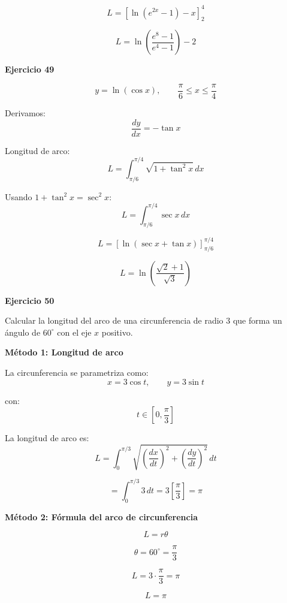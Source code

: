 \documentclass{article}
\begin{document}
\[
L=\left[\ln(e^{2x}-1)-x\right]_{2}^{4}
\]

\[
\boxed{
L=\ln\!\left(\frac{e^8-1}{e^4-1}\right)-2
}
\]

\textbf{Ejercicio 49}

\[
y=\ln(\cos x), \qquad \frac{\pi}{6}\le x\le \frac{\pi}{4}
\]

Derivamos:
\[
\frac{dy}{dx}=-\tan x
\]

Longitud de arco:
\[
L=\int_{\pi/6}^{\pi/4}\sqrt{1+\tan^2 x}\,dx
\]

Usando \(1+\tan^2 x=\sec^2 x\):
\[
L=\int_{\pi/6}^{\pi/4}\sec x\,dx
\]

\[
L=\left[\ln(\sec x+\tan x)\right]_{\pi/6}^{\pi/4}
\]

\[
\boxed{
L=\ln\!\left(\frac{\sqrt{2}+1}{\sqrt{3}}\right)
}
\]


\textbf{Ejercicio 50}

Calcular la longitud del arco de una circunferencia de radio \(3\)
que forma un ángulo de \(60^\circ\) con el eje \(x\) positivo.

\bigskip

\textbf{Método 1: Longitud de arco}

La circunferencia se parametriza como:
\[
x=3\cos t, \qquad y=3\sin t
\]

con:
\[
t\in\left[0,\frac{\pi}{3}\right]
\]

La longitud de arco es:
\[
L=\int_0^{\pi/3}
\sqrt{\left(\frac{dx}{dt}\right)^2+\left(\frac{dy}{dt}\right)^2}\,dt
\]

\[
= \int_0^{\pi/3} 3\,dt
=3\left[\frac{\pi}{3}\right]
=\pi
\]

\bigskip

\textbf{Método 2: Fórmula del arco de circunferencia}

\[
L=r\theta
\]

\[
\theta=60^\circ=\frac{\pi}{3}
\]

\[
L=3\cdot\frac{\pi}{3}=\pi
\]

\[
\boxed{L=\pi}
\]
\end{document}
